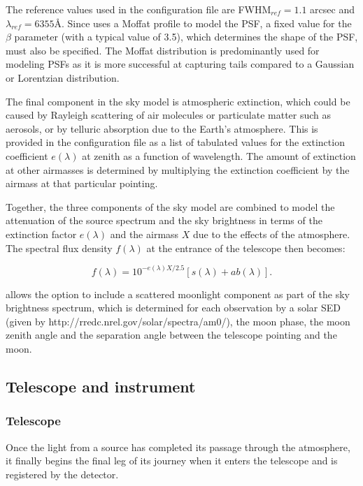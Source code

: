 The reference values used in the configuration file are FWHM$_{ref} = 1.1$ arcsec and $\lambda_{ref} = 6355 \mbox{\AA}$. Since  uses a Moffat profile to model the PSF, a fixed value for the $\beta$ parameter (with a typical value of 3.5), which determines the shape of the PSF, must also be specified. The Moffat distribution is predominantly used for modeling PSFs as it is more successful at capturing tails compared to a Gaussian or Lorentzian distribution.

The final component in the sky model is atmospheric extinction, which could be caused by Rayleigh scattering of air molecules or particulate matter such as aerosols, or by telluric absorption due to the Earth's atmosphere. This is provided in the configuration file as a list of tabulated values for the extinction coefficient $e(\lambda)$ at zenith as a function of wavelength. The amount of extinction at other airmasses is determined by multiplying the extinction coefficient by the airmass at that particular pointing.

Together, the three components of the sky model are combined to model the attenuation of the source spectrum and the sky brightness in terms of the extinction factor $e(\lambda)$ and the airmass $X$ due to the effects of the atmosphere. The spectral flux density $f(\lambda)$ at the entrance of the telescope then becomes:

\begin{equation}
    f(\lambda) = 10^{-e(\lambda)X/2.5}[s(\lambda) + ab(\lambda)].
\end{equation}

 allows the option to include a scattered moonlight component as part of the sky brightness spectrum, which is determined for each observation by a solar SED (given by http://rredc.nrel.gov/solar/spectra/am0/), the moon phase, the moon zenith angle and the separation angle between the telescope pointing and the moon.

\subsection{Telescope and instrument}

\subsubsection{Telescope}
Once the light from a source has completed its passage through the atmosphere, it finally begins the final leg of its journey when it enters the telescope and is registered by the detector.

